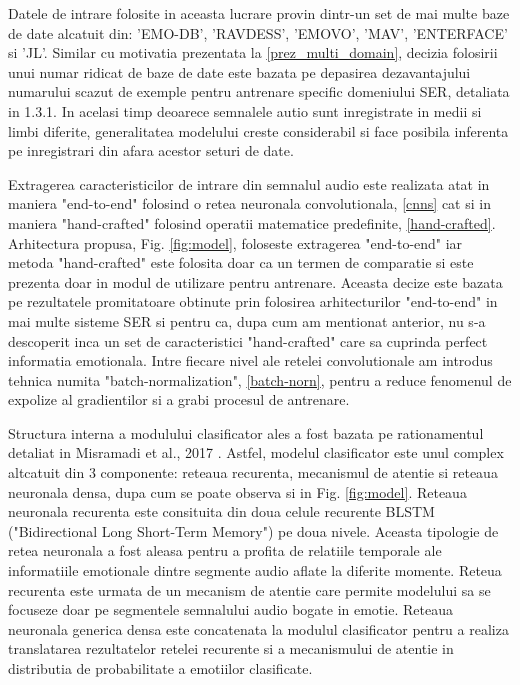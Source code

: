 \documentclass[a4paper,12pt]{book}
\begin{document}
					Datele de intrare folosite in aceasta lucrare provin dintr-un set de mai multe baze de date alcatuit din: 'EMO-DB', 'RAVDESS', 'EMOVO', 'MAV', 'ENTERFACE' si 'JL'. Similar cu motivatia prezentata la \ref{prez_multi_domain}, decizia folosirii unui numar ridicat de baze de date este bazata pe depasirea dezavantajului numarului scazut de exemple pentru antrenare specific domeniului SER, detaliata in 1.3.1. In acelasi timp deoarece semnalele autio sunt inregistrate in medii si limbi diferite, generalitatea modelului creste considerabil si face posibila inferenta pe inregistrari din afara acestor seturi de date. \par
					
					Extragerea caracteristicilor de intrare din semnalul audio este realizata atat in maniera "end-to-end" folosind o retea neuronala convolutionala, \ref{cnns} cat si in maniera "hand-crafted" folosind operatii matematice predefinite, \ref{hand-crafted}. Arhitectura propusa, Fig. \ref{fig:model}, foloseste extragerea "end-to-end" iar metoda "hand-crafted" este folosita doar ca un termen de comparatie si este prezenta doar in modul de utilizare pentru antrenare. Aceasta decize este bazata pe rezultatele promitatoare obtinute prin folosirea arhitecturilor "end-to-end"  in mai multe sisteme SER si pentru ca, dupa cum am mentionat anterior, nu s-a descoperit inca un set de caracteristici "hand-crafted" care sa cuprinda perfect informatia emotionala. Intre fiecare nivel ale retelei convolutionale am introdus tehnica numita "batch-normalization", \ref{batch-norn}, pentru a reduce fenomenul de expolize al gradientilor si a grabi procesul de antrenare. \par
					Structura interna a modulului clasificator ales a fost bazata pe rationamentul detaliat in Misramadi et al., 2017 \cite{misramadi}. Astfel, modelul clasificator este unul complex altcatuit din 3 componente: reteaua recurenta, mecanismul de atentie si reteaua neuronala densa, dupa cum se poate observa si in Fig. \ref{fig:model}.  
					Reteaua neuronala recurenta este consituita din doua celule recurente BLSTM ("Bidirectional Long Short-Term Memory") pe doua nivele. Aceasta tipologie de retea neuronala a fost aleasa pentru a profita de relatiile temporale ale informatiile emotionale dintre segmente audio aflate la diferite momente. Reteua recurenta este urmata de un mecanism de atentie care permite modelului sa se focuseze doar pe segmentele semnalului audio bogate in emotie. Reteaua neuronala generica densa este concatenata la modulul clasificator pentru a realiza translatarea rezultatelor retelei recurente si a mecanismului de atentie in distributia de probabilitate a emotiilor clasificate.\par
					
\end{document}
